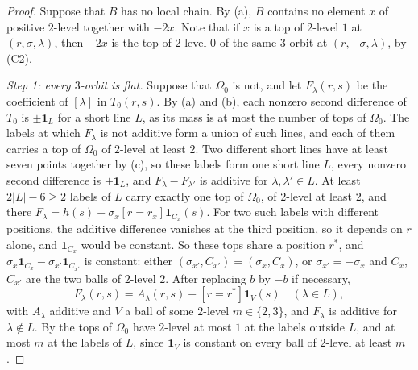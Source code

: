 \begin{proof}
Suppose that $B$ has no local chain. By (a), $B$
contains no element $x$ of positive $2$-level together with $-2x$. Note that
if $x$ is a top of $2$-level $1$ at $(r,\sigma,\lambda)$, then $-2x$ is the
top of $2$-level $0$ of the same $3$-orbit at $(r,-\sigma,\lambda)$, by (C2).

\emph{Step 1: every $3$-orbit is flat.} Suppose that $\Omega_{0}$ is not, and
let $F_{\lambda}(r,s)$ be the coefficient of $[\lambda]$ in $T_{0}(r,s)$. By
(a) and (b), each nonzero second
difference of $T_{0}$ is $\pm\mathbf 1_{L}$ for a short line $L$, as its mass
is at most the number of tops of $\Omega_{0}$. The labels at which
$F_{\lambda}$ is not additive form a union of such lines, and each of them
carries a top of $\Omega_{0}$ of $2$-level at least $2$. Two different short
lines have at least seven points together by (c), so
these labels form one short line $L$, every nonzero second difference is
$\pm\mathbf 1_{L}$, and $F_{\lambda}-F_{\lambda'}$ is additive for $\lambda,\lambda'\in L$. At least $2|L|-6\ge2$
labels of $L$ carry exactly one top of $\Omega_{0}$, of $2$-level at least
$2$, and there $F_{\lambda}=h(s)+\sigma_{x}[r=r_{x}]\mathbf 1_{C_{x}}(s)$.
For two such labels with different positions, the additive difference
vanishes at the third position, so it depends on $r$ alone, and
$\mathbf 1_{C_{x}}$ would be constant. So these tops share a position $r^{*}$,
and $\sigma_{x}\mathbf 1_{C_{x}}-\sigma_{x'}\mathbf 1_{C_{x'}}$ is constant:
either $(\sigma_{x'},C_{x'})=(\sigma_{x},C_{x})$, or $\sigma_{x'}=-\sigma_{x}$
and $C_{x}$, $C_{x'}$ are the two balls of $2$-level $2$. After replacing $b$
by $-b$ if necessary,
\[
  F_{\lambda}(r,s)=A_{\lambda}(r,s)+[r=r^{*}]\mathbf 1_{V}(s)\quad
  (\lambda\in L),
\]
with $A_{\lambda}$ additive and $V$ a ball of some $2$-level $m\in\{2,3\}$,
and $F_{\lambda}$ is additive for $\lambda\notin L$. By
 the tops of $\Omega_{0}$ have $2$-level at most $1$ at
the labels outside $L$, and at most $m$ at the labels of $L$, since
$\mathbf 1_{V}$ is constant on every ball of $2$-level at least $m$.


\end{proof}
